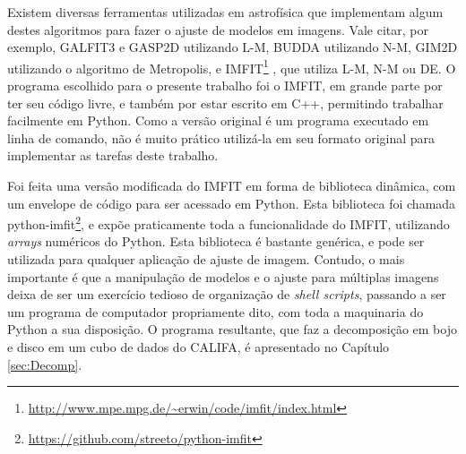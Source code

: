 Existem diversas ferramentas utilizadas em astrofísica que implementam algum
destes algoritmos para fazer o ajuste de modelos em imagens. Vale citar, por
exemplo, GALFIT3 \citep{Peng2010} e GASP2D \citep{MendezAbreu2008} utilizando
L-M, BUDDA \citep{DeSouza2004} utilizando N-M, GIM2D \citep{Simard2002}
utilizando o algoritmo de Metropolis, e
IMFIT\footnote{\url{http://www.mpe.mpg.de/~erwin/code/imfit/index.html}}
\citet{Erwin2015}, que utiliza L-M, N-M ou DE. O programa escolhido para o
presente trabalho foi o IMFIT, em grande parte por ter seu código livre, e
também por estar escrito em C++, permitindo trabalhar facilmente em Python.
Como a versão original é um programa executado em linha de comando, não é muito
prático utilizá-la em seu formato original para implementar as tarefas deste
trabalho.

Foi feita uma versão modificada do IMFIT em forma de biblioteca dinâmica, com um
envelope de código para ser acessado em Python. Esta biblioteca foi chamada
python-imfit\footnote{\url{https://github.com/streeto/python-imfit}}, e expõe
praticamente toda a funcionalidade do IMFIT, utilizando {\em arrays} numéricos
do Python. Esta biblioteca é bastante genérica, e pode ser utilizada para
qualquer aplicação de ajuste de imagem. Contudo, o mais importante é que a
manipulação de modelos e o ajuste para múltiplas imagens deixa de ser um
exercício tedioso de organização de {\em shell scripts}\fixme, passando a ser um
programa de computador propriamente dito, com toda a maquinaria do Python a sua
disposição. O programa resultante, que faz a decomposição em bojo e disco em um
cubo de dados do CALIFA, é apresentado no Capítulo \ref{sec:Decomp}.

